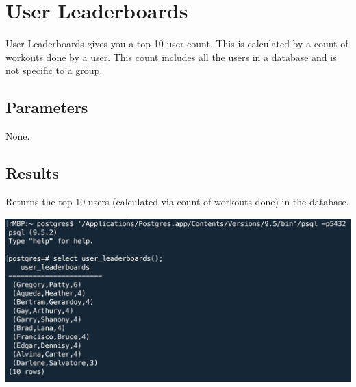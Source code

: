 \section{User Leaderboards}
User Leaderboards gives you a top 10 user count. This is calculated by a count of workouts done by a user. This count includes all the users in a database and is not specific to a group.

\subsection*{Parameters}
None.

\subsection*{Results}
Returns the top 10 users (calculated via count of workouts done) in the database.

\begin{center}
\includegraphics[width=\columnwidth]{include/assets/screenshots/user_leaderboards}
\end{center}